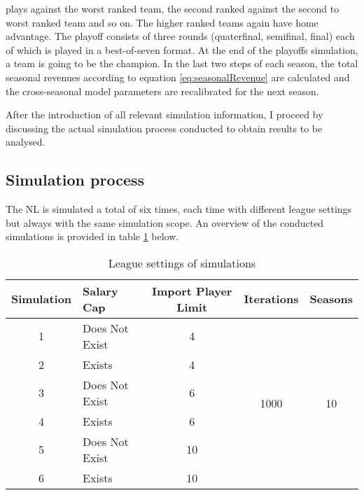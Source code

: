 \documentclass[12pt, a4paper]{article}
\begin{document}
plays against the worst ranked team, the second ranked against the second to worst ranked team and so on. The higher ranked teams again have home advantage. The playoff consists of three rounds (quaterfinal, semifinal, final) each of which is played in a best-of-seven format. At the end of the playoffs simulation, a team is going to be the champion. In the last two steps of each season, the total seasonal revenues according to equation \ref{eq:seasonalRevenue} are calculated and the cross-seasonal model parameters are recalibrated for the next season. 

\noindent
After the introduction of all relevant simulation information, I proceed by discussing the actual simulation process conducted to obtain results to be analysed. 

\subsection{Simulation process}

The NL is simulated a total of six times, each time with different league settings but always with the same simulation scope. An overview of the conducted simulations is provided in table \ref{table:leagueSettings} below.

\vspace{0.5cm}
\begin{table}[h!]
    \centering
    \caption{League settings of simulations}
    \label{table:leagueSettings}
    \begin{tabular}{clccc}
        \toprule
        Simulation & Salary Cap & Import Player Limit & Iterations & Seasons \\
        \midrule
        1 & Does Not Exist & 4 & \multirow{6}{*}{1000} & \multirow{6}{*}{10} \\
        2 & Exists & 4 & \\
        3 & Does Not Exist & 6 & \\
        4 & Exists & 6 & \\
        5 & Does Not Exist & 10 & \\
        6 & Exists & 10 & \\
        \bottomrule
    \end{tabular}
\end{table}
\vspace{0.5cm}
\end{document}
